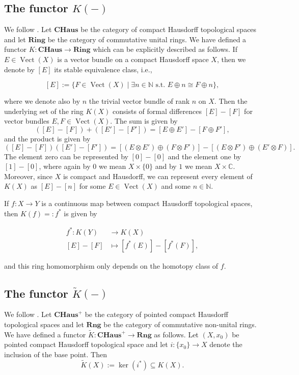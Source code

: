 \documentclass[12pt,a4paper]{amsart}
\theoremstyle{plain}
\theoremstyle{definition}
\theoremstyle{remark}
\begin{document}
\subsection{The functor $K(-)$}
We follow \cite[p.~44]{ati67}.
Let $\mathbf{CHaus}$ be the category of compact Hausdorff topological spaces and let $\mathbf{Ring}$ be the category of commutative unital rings.
We have defined a functor $K \colon \mathbf{CHaus} \to \mathbf{Ring}$ which can be explicitly described as follows.
If $E \in \operatorname{Vect}(X)$ is a vector bundle on a compact Hausdorff space $X$, then we denote by $[E]$ its stable equivalence class, i.e.,

\[ [E] := \{ F \in \operatorname{Vect}(X) \mid \exists n \in \mathbb{N} \text{ s.t.~} E \oplus n \cong F \oplus n \}, \]

where we denote also by $n$ the trivial vector bundle of rank $n$ on $X$.
Then the underlying set of the ring $K(X)$ consists of formal differences $[E] - [F]$ for vector bundles $E, F \in \operatorname{Vect}(X)$.
The sum is given by
\[ ([E] - [F]) + ([E'] - [F']) = [E \oplus E'] - [F \oplus F'], \]
and the product is given by
\[ ([E] - [F]) ([E'] - [F']) = [(E \otimes E') \oplus (F \otimes F')] - [(E \otimes F') \oplus (E' \otimes F)]. \]
The element zero can be represented by $[0] - [0]$ and the element one by $[1] - [0]$, where again by $0$ we mean $X \times \{0\}$ and by $1$ we mean $X \times \mathbb{C}$.
Moreover, since $X$ is compact and Hausdorff, we can represent every element of $K(X)$ as $[E] - [n]$ for some $E \in \operatorname{Vect}(X)$ and some $n \in \mathbb{N}$.

If $f \colon X \to Y$ is a continuous map between compact Hausdorff topological spaces, then $K(f) =: f^{*}$ is given by

\begin{align*}
  f^{*} \colon K(Y) & \to K(X) \\
  [E] - [F] & \mapsto [f^{*}(E)] - [f^{*}(F)],
\end{align*}

and this ring homomorphism only depends on the homotopy class of $f$.

\subsection{The functor $\tilde{K}(-)$}
We follow \cite[p.~66]{ati67}.
Let $\mathbf{CHaus}^{+}$ be the category of pointed compact Hausdorff topological spaces and let $\mathbf{Rng}$ be the category of commutative non-unital rings.
We have defined a functor $\tilde{K} \colon \mathbf{CHaus}^{+} \to \mathbf{Rng}$ as follows.
Let $(X,x_{0})$ be pointed compact Hausdorff topological space and let $i \colon \{ x_{0} \} \to X$ denote the inclusion of the base point.
Then
\[ \tilde{K}(X) := \ker(i^{*}) \subseteq K(X). \]
\end{document}
